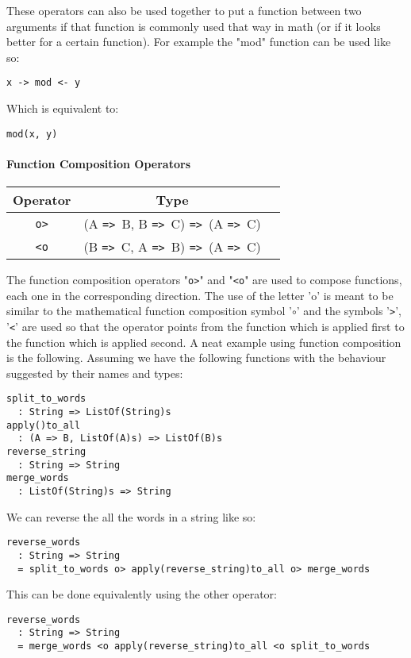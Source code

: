 \documentclass{article}
\def\ra{\texttt{=>}\ }
\begin{document}
These operators can also be used together to put a function between two arguments
if that function is commonly used that way in math (or if it looks better for a
certain function). For example the "mod" function can be used like so:
\begin{center}
\texttt{x -> mod <- y}
\end{center}
Which is equivalent to:
\begin{center}
\texttt{mod(x, y)}
\end{center}

\paragraph{Function Composition Operators}
\begin{center}
\begin{tabular}{ |c|c|c| } 
\hline
Operator & Type \\ 
\hline
\hline
\texttt{o>} & (A \ra B, B \ra C) \ra (A \ra C) \\
\hline
\texttt{<o} & (B \ra C, A \ra B) \ra (A \ra C) \\
\hline
\end{tabular}
\end{center}
The function composition operators "\texttt{o>}" and "\texttt{<o}" are used to 
compose functions, each one in the corresponding direction. The use of the letter 'o'
is meant to be similar to the mathematical function composition symbol '\(\circ\)'
and the symbols '\texttt{>}', '\texttt{<}' are used so that the operator points from
the function which is applied first to the function which is applied second.
A neat example using function composition is the following. Assuming we have the
following functions with the behaviour suggested by their names and types: 
\begin{verbatim}
split_to_words
  : String => ListOf(String)s
apply()to_all
  : (A => B, ListOf(A)s) => ListOf(B)s
reverse_string
  : String => String
merge_words
  : ListOf(String)s => String
\end{verbatim}
We can reverse the all the words in a string like so:
\begin{verbatim}
reverse_words
  : String => String
  = split_to_words o> apply(reverse_string)to_all o> merge_words
\end{verbatim}
This can be done equivalently using the other operator:
\begin{verbatim}
reverse_words
  : String => String
  = merge_words <o apply(reverse_string)to_all <o split_to_words
\end{verbatim}
\end{document}
